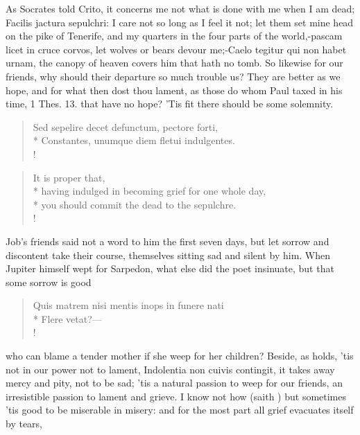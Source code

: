 {%
As Socrates told Crito, it concerns me not what is done with me when I
am dead; Facilis jactura sepulchri: I care not so long as I feel it
not; let them set mine head on the pike of Tenerife, and my quarters in
the four parts of the world,-pascam licet in cruce corvos, let wolves
or bears devour me;-Caelo tegitur qui non habet urnam, the canopy
of heaven covers him that hath no tomb. So likewise for our friends,
why should their departure so much trouble us? They are better as we
hope, and for what then dost thou lament, as those do whom Paul taxed
in his time, 1 Thes.  13. that have no hope? 'Tis fit there should
be some solemnity.
%
%
\begin{latin}%
\begin{verse}%
Sed sepelire decet defunctum, pectore forti,\\*
Constantes, unumque diem fletui indulgentes.\\!
\end{verse}%
\end{latin}%
\translationrule%
\begin{verse}%
It is proper that,\\*
having indulged in becoming grief for one whole day,\\*
you should commit the dead to the sepulchre.\\!
\end{verse}%
%
Job's friends said not a word to him the first seven days, but let
sorrow and discontent take their course, themselves sitting sad and
silent by him. When Jupiter himself wept for Sarpedon, what else did
the poet insinuate, but that some sorrow is good
%
%
\begin{latin}%
\begin{verse}%
Quis matrem nisi mentis inops in funere nati\\*
Flere vetat?---\\!
\end{verse}%
\end{latin}%
%
who can blame a tender mother if she weep for her children? Beside, as
\Plutarch holds, 'tis not in our power not to lament, Indolentia
non cuivis contingit, it takes away mercy and pity, not to be sad; 'tis
a natural passion to weep for our friends, an irresistible passion to
lament and grieve. I know not how (saith \Seneca) but sometimes 'tis
good to be miserable in misery: and for the most part all grief
evacuates itself by tears,
%
%
}

